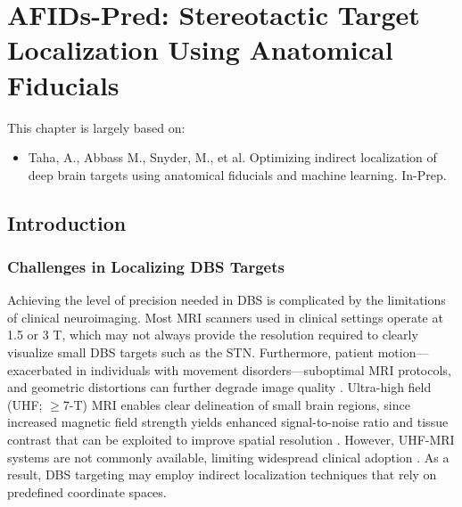 \chapter{AFIDs-Pred: Stereotactic Target Localization Using Anatomical Fiducials}\label{chap:afidspred}
\newpage
\sloppy
This chapter is largely based on:
\begin{itemize}[noitemsep,topsep=0pt]
	\item Taha, A., Abbass M., Snyder, M., et al. Optimizing indirect localization of deep brain targets using anatomical fiducials and machine learning. In-Prep.
\end{itemize}

\section{Introduction}
\subsection{Challenges in Localizing DBS Targets}
Achieving the level of precision needed in DBS is complicated by the limitations of clinical neuroimaging. Most MRI scanners used in clinical settings operate at 1.5 or 3 T, which may not always provide the resolution required to clearly visualize small DBS targets such as the STN. Furthermore, patient motion—exacerbated in individuals with movement disorders—suboptimal MRI protocols, and geometric distortions can further degrade image quality \cite{Boutet2021-vg, Chandran2016-eg, Lau2018-fp}. Ultra-high field (UHF; $\geq$7-T) MRI enables clear delineation of small brain regions, since increased magnetic field strength yields enhanced signal-to-noise ratio and tissue contrast that can be exploited to improve spatial resolution \cite{Abosch2010-jn, Duchin2012-db, Lau2017-ea, Lau2020-dh, Lenglet2012-ii}. However, UHF-MRI systems are not commonly available, limiting widespread clinical adoption \cite{Clarke2020-ky}. As a result, DBS targeting may employ indirect localization techniques that rely on predefined coordinate spaces.

